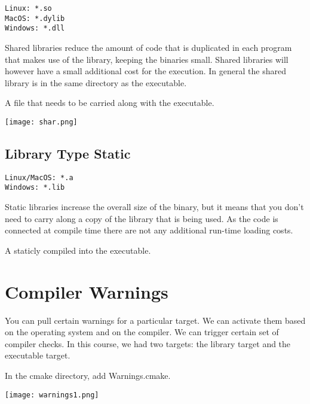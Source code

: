 \begin{verbatim}
Linux: *.so
MacOS: *.dylib
Windows: *.dll
\end{verbatim}

Shared libraries reduce the amount of code that is duplicated in each program that makes use of the library, keeping the binaries small.
Shared libraries will however have a small additional cost for the execution.
In general the shared library is in the same directory as the executable.

A file that needs to be carried along with the executable.

\begin{center}
    \texttt{[image: shar.png]}
\end{center}


\subsection{Library Type Static}

\begin{verbatim}
Linux/MacOS: *.a
Windows: *.lib
\end{verbatim}

Static libraries increase the overall size of the binary, but it means that you don't need to carry along a copy of the library that is being used.
As the code is connected at compile time there are not any additional run-time loading costs.

A staticly compiled into the executable.


\section{Compiler Warnings}

You can pull certain warnings for a particular target.
We can activate them based on the operating system and on the compiler.
We can trigger certain set of compiler checks.
In this course, we had two targets: the library target and the executable target.

In the cmake directory, add Warnings.cmake. 

\begin{center}
    \texttt{[image: warnings1.png]}
\end{center}

